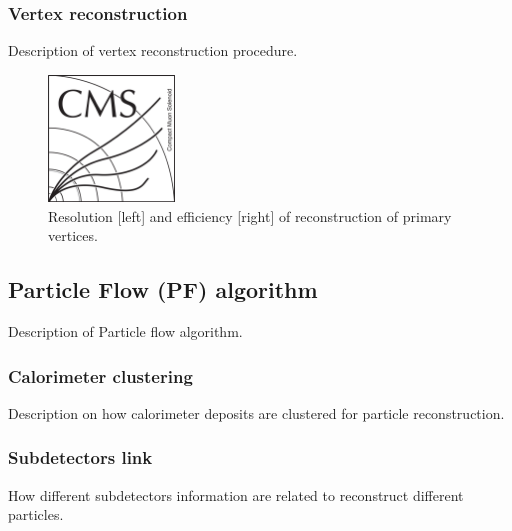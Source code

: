 \subsubsection{Vertex reconstruction}

Description of vertex reconstruction procedure.

\begin{figure}[!Hhtbp]
  \begin{center}
    \includegraphics[width=0.3\textwidth]{figs/CMSlogo.png}
    \caption{Resolution [left] and efficiency [right] of reconstruction of primary vertices.}
    \label{fig:VertexRec}
  \end{center}
\end{figure}

\subsection{Particle Flow (PF) algorithm}

Description of Particle flow algorithm. 

\subsubsection{Calorimeter clustering}

Description on how calorimeter deposits are clustered for particle reconstruction.

\subsubsection{Subdetectors link}

How different subdetectors information are related to reconstruct different particles. 

